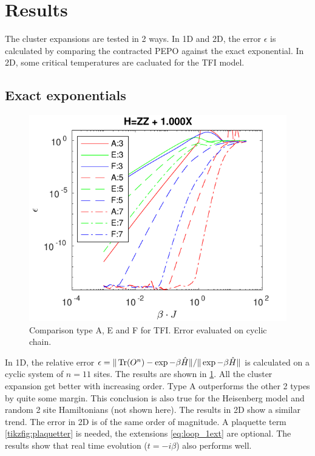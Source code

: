 \documentclass[twocolumn]{article}
\newcounter{a}
\newcounter{b}
\begin{document}
\section{Results}
The cluster expansions are tested in 2 ways. In 1D and 2D, the error $\epsilon$ is calculated by comparing the contracted PEPO against the exact exponential. In 2D, some critical temperatures are cacluated for the TFI model.

\subsection{Exact exponentials}\label{subsec:exexp}
\begin{figure}[h!]
    \center
    \includegraphics[width=\linewidth]{../Figuren/benchmarking/t_ising_small.pdf}
    \caption{Comparison type A, E and F for TFI. Error evaluated on cyclic chain. }
    \label{fig:benchmark:tising}
\end{figure}

In 1D, the relative error $\epsilon = \| \Tr( O^n ) -  \exp  -\beta \hat{H}  \|  /  \| \exp  -\beta \hat{H}  \| $ is calculated on a cyclic system of $n=11$ sites. The results are shown in \cref{fig:benchmark:tising}. All the cluster expansion get better with increasing order. Type A outperforms the other 2 types by quite some margin. This conclusion is also true for the Heisenberg model and random 2 site Hamiltonians (not shown here). The results in 2D show a similar trend. The error in 2D is of the same order of magnitude. A plaquette term \cref{tikzfig:plaquetter} is needed, the extensions \cref{eq:loop_1ext}  are optional. The results show that real time evolution ($t = - i \beta$) also performs well.
\end{document}
